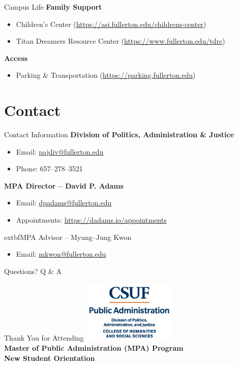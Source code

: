\documentclass[10pt]{beamer}
\begin{document}
\begin{frame}{Campus Life}
\textbf{Family Support}
\begin{itemize}
  \item Children's Center \small(\url{https://asi.fullerton.edu/childrens-center})
  \item Titan Dreamers Resource Center \small(\url{https://www.fullerton.edu/tdrc})
\end{itemize}

\textbf{Access}
\begin{itemize}
  \item Parking \& Transportation \small(\url{https://parking.fullerton.edu})
\end{itemize}
\end{frame}

\section{Contact}
\begin{frame}{Contact Information}
\textbf{Division of Politics, Administration \& Justice}\\[-2pt]
\begin{itemize}
  \item Email: \href{mailto:pajdiv@fullerton.edu}{pajdiv@fullerton.edu}
  \item Phone: 657–278–3521
\end{itemize}

\textbf{MPA Director – David P. Adams}\\[-2pt]
\begin{itemize}
  \item Email: \href{mailto:dpadams@fullerton.edu}{dpadams@fullerton.edu}
  \item Appointments: \url{https://dadams.io/appointments}
\end{itemize}

	extbf{MPA Advisor -- Myung--Jung Kwon}\\[-2pt]
\begin{itemize}
  \item Email: \href{mailto:mkwon@fullerton.edu}{mkwon@fullerton.edu}
\end{itemize}
\end{frame}

\begin{frame}[standout]{Questions?}
Q \& A
\end{frame}

\begin{frame}{Thank You for Attending}
\centering
\includegraphics[height=3cm]{images/PUBLIC-ADMINISTRATION-color.png}\\[10pt]
\textbf{Master of Public Administration (MPA) Program}\\
\textbf{New Student Orientation}
\end{frame}
\end{document}
